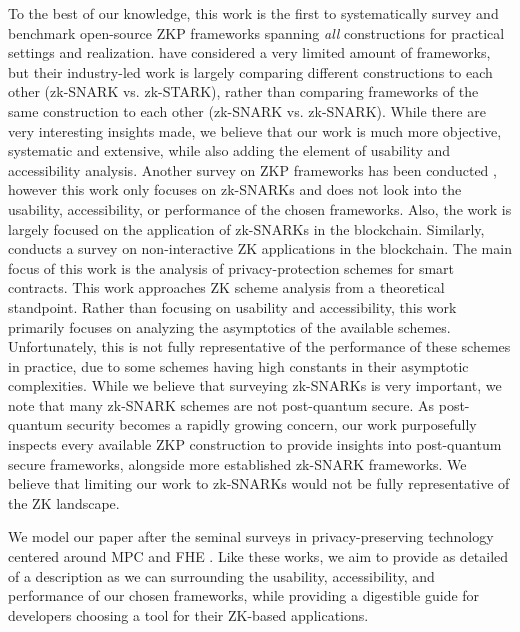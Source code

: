 To the best of our knowledge, this work is the first to systematically survey and benchmark open-source ZKP frameworks spanning \textit{all} constructions for practical settings and realization. \cite{CelerNetwork2023Pantheon, Delendum2023ZKSystemBenchmarking} have considered a very limited amount of frameworks, but their industry-led work is largely comparing different constructions to each other (zk-SNARK vs. zk-STARK), rather than comparing frameworks of the same construction to each other (zk-SNARK vs. zk-SNARK). While there are very interesting insights made, we believe that our work is much more objective, systematic and extensive, while also adding the element of usability and accessibility analysis.
Another survey on ZKP frameworks has been conducted \cite{9520375}, however this work only focuses on zk-SNARKs and does not look into the usability, accessibility, or performance of the chosen frameworks. Also, the work is largely focused on the application of zk-SNARKs in the blockchain. Similarly, \cite{partala2020non} conducts a survey on non-interactive ZK applications in the blockchain. The main focus of this work is the analysis of privacy-protection schemes for smart contracts. This work approaches ZK scheme analysis from a theoretical standpoint. Rather than focusing on usability and accessibility, this work primarily focuses on analyzing the asymptotics of the available schemes. Unfortunately, this is not fully representative of the performance of these schemes in practice, due to some schemes having high constants in their asymptotic complexities. While we believe that surveying zk-SNARKs is very important, we note that many zk-SNARK schemes are not post-quantum secure. As post-quantum security becomes a rapidly growing concern, our work purposefully inspects every available ZKP construction to provide insights into post-quantum secure frameworks, alongside more established zk-SNARK frameworks. We believe that limiting our work to zk-SNARKs would not be fully representative of the ZK landscape.

We model our paper after the seminal surveys in privacy-preserving technology centered around MPC \cite{hastings2019sok} and FHE \cite{viand2021sok}. 
Like these works, we aim to provide as detailed of a description as we can surrounding the usability, accessibility, and performance of our chosen frameworks, while providing a digestible guide for developers choosing a tool for their ZK-based applications.